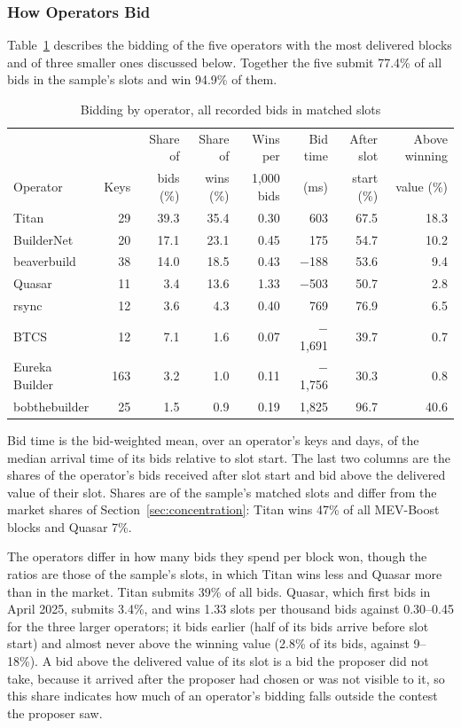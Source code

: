 \documentclass[11pt]{article}
\begin{document}
\subsubsection{How Operators Bid}
\label{sec:builder_strat}

Table~\ref{tab:operators} describes the bidding of the five operators with
the most delivered blocks and of three smaller ones discussed below.
Together the five submit 77.4\% of all bids in the sample's slots and win
94.9\% of them.

\begin{table}[!htbp]
\centering
\small
\caption{Bidding by operator, all recorded bids in matched slots}
\label{tab:operators}
\begin{tabular}{lrrrrrrr}
\toprule
 & & Share of & Share of & Wins per & Bid time & After slot & Above winning \\
Operator & Keys & bids (\%) & wins (\%) & 1{,}000 bids & (ms) & start (\%) & value (\%) \\
\midrule
Titan & 29 & 39.3 & 35.4 & 0.30 & 603 & 67.5 & 18.3 \\
BuilderNet & 20 & 17.1 & 23.1 & 0.45 & 175 & 54.7 & 10.2 \\
beaverbuild & 38 & 14.0 & 18.5 & 0.43 & $-$188 & 53.6 & 9.4 \\
Quasar & 11 & 3.4 & 13.6 & 1.33 & $-$503 & 50.7 & 2.8 \\
rsync & 12 & 3.6 & 4.3 & 0.40 & 769 & 76.9 & 6.5 \\
\midrule
BTCS & 12 & 7.1 & 1.6 & 0.07 & $-$1{,}691 & 39.7 & 0.7 \\
Eureka Builder & 163 & 3.2 & 1.0 & 0.11 & $-$1{,}756 & 30.3 & 0.8 \\
bobthebuilder & 25 & 1.5 & 0.9 & 0.19 & 1{,}825 & 96.7 & 40.6 \\
\bottomrule
\end{tabular}

\vspace{0.5em}
\footnotesize Bid time is the bid-weighted mean, over an operator's keys and
days, of the median arrival time of its bids relative to slot start. The
last two columns are the shares of the operator's bids received after slot
start and bid above the delivered value of their slot. Shares are of the sample's
matched slots and differ from the market shares of
Section~\ref{sec:concentration}: Titan wins 47\% of all MEV-Boost blocks and
Quasar 7\%.
\end{table}

The operators differ in how many bids they spend per block won, though the
ratios are those of the sample's slots, in which Titan wins less and Quasar
more than in the market. Titan submits 39\% of all bids. Quasar, which
first bids in April 2025, submits 3.4\%, and wins 1.33 slots per thousand
bids against 0.30--0.45 for the three larger operators; it bids earlier
(half of its bids arrive before slot start) and almost never above the
winning value (2.8\% of its bids, against 9--18\%). A bid above the
delivered value of its slot is a bid the proposer did not take, because it
arrived after the proposer had chosen or was not visible to it, so this
share indicates how much of an operator's bidding falls outside the contest
the proposer saw.
\end{document}
